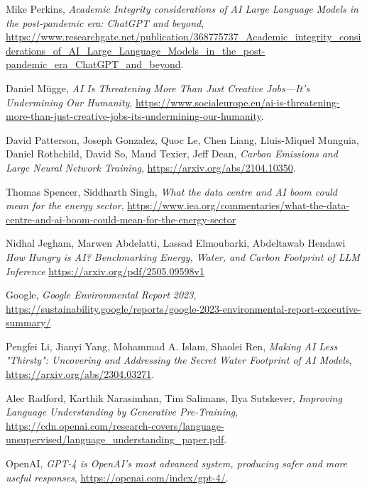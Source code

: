 \begin{thebibliography}{9}

	Mike Perkins,
	\textit{Academic Integrity considerations of AI Large Language Models in the post-pandemic era: ChatGPT and beyond},
	\url{https://www.researchgate.net/publication/368775737_Academic_integrity_considerations_of_AI_Large_Language_Models_in_the_post-pandemic_era_ChatGPT_and_beyond}.

	Daniel Mügge,
	\textit{AI Is Threatening More Than Just Creative Jobs—It’s Undermining Our Humanity},
	\url{https://www.socialeurope.eu/ai-is-threatening-more-than-just-creative-jobs-its-undermining-our-humanity}.

	David Patterson, Joseph Gonzalez, Quoc Le, Chen Liang, Lluis-Miquel Munguia, Daniel Rothchild, David So, Maud Texier, Jeff Dean,
	\textit{Carbon Emissions and Large Neural Network Training},
	\url{https://arxiv.org/abs/2104.10350}.

	Thomas Spencer, Siddharth Singh,
	\textit{What the data centre and AI boom could mean for the energy sector},
	\url{https://www.iea.org/commentaries/what-the-data-centre-and-ai-boom-could-mean-for-the-energy-sector}

	Nidhal Jegham, Marwen Abdelatti, Lassad Elmoubarki, Abdeltawab Hendawi
	\textit{How Hungry is AI? Benchmarking Energy, Water, and Carbon Footprint of LLM Inference}
	\url{https://arxiv.org/pdf/2505.09598v1}

	Google,
	\textit{Google Environmental Report 2023},
	\url{https://sustainability.google/reports/google-2023-environmental-report-executive-summary/}

	Pengfei Li, Jianyi Yang, Mohammad A. Islam, Shaolei Ren,
	\textit{Making AI Less "Thirsty": Uncovering and Addressing the Secret Water Footprint of AI Models},
	\url{https://arxiv.org/abs/2304.03271}.

	Alec Radford, Karthik Narasimhan, Tim Salimans, Ilya Sutskever,
	\textit{Improving Language Understanding by Generative Pre-Training},
	\url{https://cdn.openai.com/research-covers/language-unsupervised/language_understanding_paper.pdf}.

	OpenAI,
	\textit{GPT-4 is OpenAI’s most advanced system, producing safer and more useful responses},
	\url{https://openai.com/index/gpt-4/}.


\end{thebibliography}
